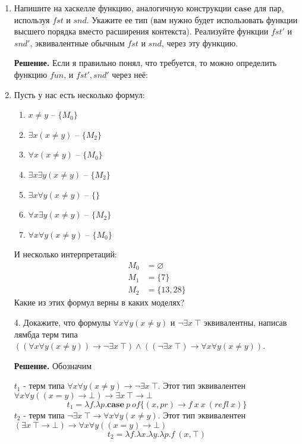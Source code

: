 \begin{enumerate}
\item Напишите на хаскелле функцию, аналогичную конструкции $\mathbf{case}$ для пар, используя $fst$ и $snd$.
    Укажите ее тип (вам нужно будет использовать функции высшего порядка вместо расширения контекста).
    Реализуйте функции $fst'$ и $snd'$, эквивалентные обычным $fst$ и $snd$, через эту функцию.

\textbf{Решение.} Если я правильно понял, что требуется, то можно определить функцию $fun$, и $fst', snd'$ через 
неё:



\item Пусть у нас есть несколько формул:
\begin{enumerate}
\item \label{it:no} $x \neq y$ -- $\{M_0\}$
\item \label{it:e} $\exists x (x \neq y)$ -- $\{M_2\}$
\item \label{it:a} $\forall x (x \neq y)$ -- $\{M_0\}$
\item \label{it:ee} $\exists x \exists y (x \neq y)$ -- $\{M_2\}$
\item \label{it:ea} $\exists x \forall y (x \neq y)$ -- $\{\}$
\item \label{it:ae} $\forall x \exists y (x \neq y)$ -- $\{M_2\}$
\item \label{it:aa} $\forall x \forall y (x \neq y)$ -- $\{M_0\}$
\end{enumerate}
И несколько интерпретаций:
\begin{align*}
M_0 & = \varnothing \\
M_1 & = \{ 7 \} \\
M_2 & = \{ 13, 28 \}
\end{align*}
Какие из этих формул верны в каких моделях?

\item[4.] Докажите, что формулы $\forall x \forall y (x \neq y)$ и $\neg \exists x\ \top$ эквивалентны,
    написав лямбда терм типа $((\forall x \forall y (x \neq y)) \to \neg \exists x\ \top) \land ((\neg \exists x\ 
    \top) \to \forall x \forall y (x \neq y))$.
    
\textbf{Решение.} Обозначим 

$t_1$ - терм типа $\forall x \forall y (x \neq y) \to \neg \exists x\ \top$. 
Этот тип эквивалентен $\forall x \forall y ((x = y) \to \bot) \to \exists x\ \top \to \bot$ 
\begin{equation*}
	t_1 = \lambda f.\lambda p. \mathbf{case}\ p \ of \{ (x, pr ) \to f \ x\ x \ (refl \ x) \} 
\end{equation*}
$t_2$ - терм типа $\neg \exists x\ \top \to \forall x \forall y (x \neq y)$. 
Этот тип эквивалентен $(\exists x\ \top \to \bot) \to \forall x \forall y ((x = y) \to \bot)$
\begin{equation*}
	t_2 = \lambda f. \lambda x. \lambda y.\lambda p. f\ (x, \top)
\end{equation*}


\end{enumerate}
